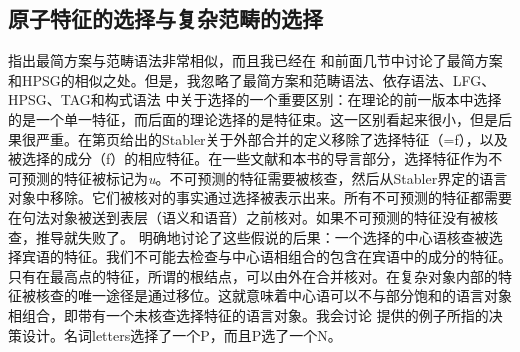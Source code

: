 \subsection{原子特征的选择与复杂范畴的选择}
\label{sec-selection-features-vs-categories}

 \citet{BE95a}指出最简方案与范畴语法非常相似，而且我已经在 和前面几节中讨论了最简方案和HPSG的相似之处。但是，我忽略了最简方案和范畴语法\indexcg、依存语法\indexdg、LFG\indexlfg、HPSG\indexhpsg、TAG\indextag 和构式语法\indexcxg
中关于选择的一个重要区别：在理论的前一版本中选择的是一个单一特征，而后面的理论选择的是特征束。这一区别看起来很小，但是后果很严重。在第\pageref{Definition-EM}页给出的Stabler关于外部合并的定义移除了选择特征（=f），以及被选择的成分（f）的相应特征。在一些文献和本书的导言部分，选择特征作为不可预测的特征被标记为\emph{u}。不可预测的特征需要被核查，然后从Stabler界定的语言对象中移除。它们被核对的事实通过选择被表示出来。所有不可预测的特征都需要在句法对象被送到表层（语义和语音）之前核对。如果不可预测的特征没有被核查，推导就失败了。 \citet[3.6]{Adger2003a}明确地讨论了这些假说的后果：一个选择的中心语核查被选择宾语的特征。我们不可能去检查与中心语相组合的包含在宾语中的成分的特征。只有在最高点的特征，所谓的根结点，可以由外在合并核对。在复杂对象内部的特征被核查的唯一途径是通过移位。这就意味着中心语可以不与部分饱和的语言对象相组合，即带有一个未核查选择特征的语言对象。我会讨论 \citet[]{Adger2003a}提供的例子所指的决策设计。名词letters选择了一个P，而且P选了一个N。
